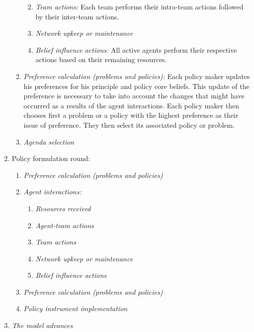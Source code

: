 \begin{enumerate}
\begin{enumerate}
\begin{enumerate}
\begin{enumerate}
			\end{enumerate}
		\item \emph{Team actions:} Each team performs their intra-team actions followed by their inter-team actions.
		\item \emph{Network upkeep or maintenance}
		\item \emph{Belief influence actions:} All active agents perform their respective actions based on their remaining resources.
		\end{enumerate}


	\item \emph{Preference calculation (problems and policies):} Each policy maker updates his preferences for his principle and policy core beliefs. This update of the preference is necessary to take into account the changes that might have occurred as a results of the agent interactions. Each policy maker then chooses first a problem or a policy with the highest preference as their issue of preference. They then select its associated policy or problem.
	\item \emph{Agenda selection}
	\end{enumerate}
	
\item Policy formulation round:


	\begin{enumerate}
	\item \emph{Preference calculation (problems and policies)}
	\item \emph{Agent interactions:} 


		\begin{enumerate}
		\item \emph{Resources received}
		\item \emph{Agent-team actions}
		\item \emph{Team actions}
		\item \emph{Network upkeep or maintenance}
		\item \emph{Belief influence actions}
		\end{enumerate}


	\item \emph{Preference calculation (problems and policies)}
	\item \emph{Policy instrument implementation} 
	\end{enumerate}
	
\item \emph{The model advances}


\end{enumerate}




